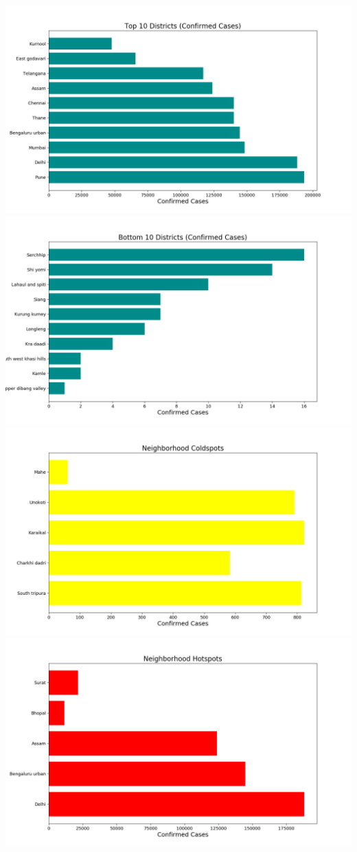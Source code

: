 \documentclass[11pt]{article}
\begin{document}
\begin{enumerate}
\begin{flushleft}
\includegraphics[width=\linewidth]{top-10.png}
\includegraphics[width=\linewidth]{bot-10.png}
\includegraphics[width=\linewidth]{cold.png}
\includegraphics[width=\linewidth]{hot.png}

\end{flushleft}
\end{enumerate}
\end{document}
